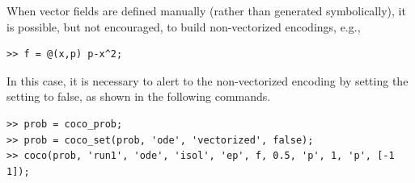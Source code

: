 When vector fields are defined manually (rather than generated symbolically), it is possible, but not encouraged, to build non-vectorized encodings, e.g., 
\begin{lstlisting}[language=coco-highlight,frame=lines]
>> f = @(x,p) p-x^2;
\end{lstlisting}
In this case, it is necessary to alert  to the non-vectorized encoding by setting the  setting to false, as shown in the following commands.
\begin{lstlisting}[language=coco-highlight,frame=lines]
>> prob = coco_prob;
>> prob = coco_set(prob, 'ode', 'vectorized', false);
>> coco(prob, 'run1', 'ode', 'isol', 'ep', f, 0.5, 'p', 1, 'p', [-1 1]);
\end{lstlisting}




